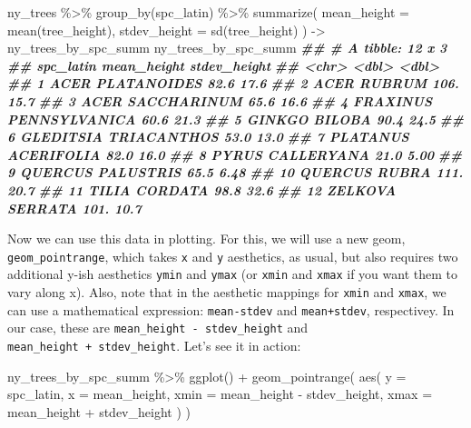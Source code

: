 \documentclass[
]{krantz}
\newenvironment{Shaded}{\begin{snugshade}}{\end{snugshade}}
\newcommand{\AttributeTok}[1]{\textcolor[rgb]{0.77,0.63,0.00}{#1}}
\newcommand{\DocumentationTok}[1]{\textcolor[rgb]{0.56,0.35,0.01}{\textbf{\textit{#1}}}}
\newcommand{\FunctionTok}[1]{\textcolor[rgb]{0.00,0.00,0.00}{#1}}
\newcommand{\NormalTok}[1]{#1}
\newcommand{\OtherTok}[1]{\textcolor[rgb]{0.56,0.35,0.01}{#1}}
\newcommand{\SpecialCharTok}[1]{\textcolor[rgb]{0.00,0.00,0.00}{#1}}
\begin{document}
\begin{Shaded}
\begin{Highlighting}[]
\NormalTok{ny\_trees }\SpecialCharTok{\%\textgreater{}\%}
  \FunctionTok{group\_by}\NormalTok{(spc\_latin) }\SpecialCharTok{\%\textgreater{}\%}
  \FunctionTok{summarize}\NormalTok{(}
    \AttributeTok{mean\_height =} \FunctionTok{mean}\NormalTok{(tree\_height),}
    \AttributeTok{stdev\_height =} \FunctionTok{sd}\NormalTok{(tree\_height)}
\NormalTok{  ) }\OtherTok{{-}\textgreater{}}\NormalTok{ ny\_trees\_by\_spc\_summ}
\NormalTok{ny\_trees\_by\_spc\_summ}
\DocumentationTok{\#\# \# A tibble: 12 x 3}
\DocumentationTok{\#\#    spc\_latin              mean\_height stdev\_height}
\DocumentationTok{\#\#    \textless{}chr\textgreater{}                        \textless{}dbl\textgreater{}        \textless{}dbl\textgreater{}}
\DocumentationTok{\#\#  1 ACER PLATANOIDES              82.6        17.6 }
\DocumentationTok{\#\#  2 ACER RUBRUM                  106.         15.7 }
\DocumentationTok{\#\#  3 ACER SACCHARINUM              65.6        16.6 }
\DocumentationTok{\#\#  4 FRAXINUS PENNSYLVANICA        60.6        21.3 }
\DocumentationTok{\#\#  5 GINKGO BILOBA                 90.4        24.5 }
\DocumentationTok{\#\#  6 GLEDITSIA TRIACANTHOS         53.0        13.0 }
\DocumentationTok{\#\#  7 PLATANUS ACERIFOLIA           82.0        16.0 }
\DocumentationTok{\#\#  8 PYRUS CALLERYANA              21.0         5.00}
\DocumentationTok{\#\#  9 QUERCUS PALUSTRIS             65.5         6.48}
\DocumentationTok{\#\# 10 QUERCUS RUBRA                111.         20.7 }
\DocumentationTok{\#\# 11 TILIA CORDATA                 98.8        32.6 }
\DocumentationTok{\#\# 12 ZELKOVA SERRATA              101.         10.7}
\end{Highlighting}
\end{Shaded}

Now we can use this data in plotting. For this, we will use a new geom, \texttt{geom\_pointrange}, which takes \texttt{x} and \texttt{y} aesthetics, as usual, but also requires two additional y-ish aesthetics \texttt{ymin} and \texttt{ymax} (or \texttt{xmin} and \texttt{xmax} if you want them to vary along x). Also, note that in the aesthetic mappings for \texttt{xmin} and \texttt{xmax}, we can use a mathematical expression: \texttt{mean-stdev} and \texttt{mean+stdev}, respectivey. In our case, these are \texttt{mean\_height\ -\ stdev\_height} and \texttt{mean\_height\ +\ stdev\_height}. Let's see it in action:

\begin{Shaded}
\begin{Highlighting}[]
\NormalTok{ny\_trees\_by\_spc\_summ }\SpecialCharTok{\%\textgreater{}\%}
\FunctionTok{ggplot}\NormalTok{() }\SpecialCharTok{+}
  \FunctionTok{geom\_pointrange}\NormalTok{(}
      \FunctionTok{aes}\NormalTok{(}
        \AttributeTok{y =}\NormalTok{ spc\_latin,}
        \AttributeTok{x =}\NormalTok{ mean\_height,}
        \AttributeTok{xmin =}\NormalTok{ mean\_height }\SpecialCharTok{{-}}\NormalTok{ stdev\_height,}
        \AttributeTok{xmax =}\NormalTok{ mean\_height }\SpecialCharTok{+}\NormalTok{ stdev\_height}
\NormalTok{      )}
\NormalTok{    )}
\end{Highlighting}
\end{Shaded}
\end{document}
